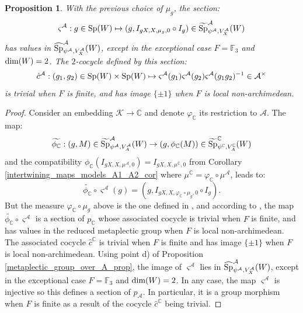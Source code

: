 \documentclass[11pt]{article}
\theoremstyle{plain}
\newtheorem{prop}[theo]{Proposition}
\theoremstyle{definition}
\theoremstyle{plain}
\theoremstyle{definition}
\theoremstyle{plain}
\begin{document}
\begin{prop} With the previous choice of $\mu_g$, the section: 
$$\varsigma^\mathcal{A} : g \in \textup{Sp}(W) \mapsto (g,I_{gX,X,\mu_g,0} \circ I_g) \in \widetilde{\textup{Sp}}_{\psi^\mathcal{A},V_X^\mathcal{A}}^\mathcal{A}(W)$$
has values in $\widehat{\textup{Sp}}_{\psi^\mathcal{A},V_X^\mathcal{A}}^\mathcal{A}(W)$, except in the exceptional case $F= \mathbb{F}_3$ and $\textup{dim}(W) = 2$. The $2$-cocycle defined by this section:
$$\hat{c}^\mathcal{A} : (g_1,g_2) \in \textup{Sp}(W) \times \textup{Sp}(W) \mapsto \varsigma^\mathcal{A}(g_1) \varsigma^\mathcal{A}(g_2) \varsigma^\mathcal{A}(g_1g_2)^{-1} \in \mathcal{A}^\times$$
is trivial when $F$ is finite, and has image $\{ \pm 1 \}$ when $F$ is local non-archimedean. \end{prop}

\begin{proof} Consider an embedding $\mathcal{K} \to \mathbb{C}$ and denote $\varphi_\mathbb{C}$ its restriction to $\mathcal{A}$. The map:
$$\widetilde{\phi_\mathbb{C}} : (g,M) \in  \widetilde{\textup{Sp}}_{\psi^\mathcal{A},V_A^\mathcal{A}}^\mathcal{A}(W) \to (g,\phi_\mathbb{C}(M)) \in \widetilde{\textup{Sp}}_{\psi^\mathbb{C},V_A^\mathbb{C}}^\mathbb{C}(W)$$
and the compatibility $\phi_\mathbb{C} (I_{gX,X,\mu^\mathcal{A},0}) = I_{gX,X,\mu^\mathbb{C},0}$ from Corollary \ref{intertwining_maps_models_A1_A2_cor} where $\mu^\mathbb{C}=\varphi_\mathbb{C} \circ \mu^\mathcal{A}$, leads to:
$$\widetilde{\phi_\mathbb{C}} \circ \varsigma^\mathcal{A} (g) = (g, I_{gX,X,\varphi_\mathbb{C} \circ \mu_g,0} \circ I_g).$$
But the measure $\varphi_\mathbb{C} \circ \mu_g$ above is the one defined in \cite[Lem. 3.23]{trias_theta1}, and according to \cite[Th. 3.27]{trias_theta1}, the map $\widetilde{\phi_\mathbb{C}} \circ \varsigma^\mathcal{A}$ is a section of $p_\mathbb{C}$ whose associated cocycle is trivial when $F$ is finite, and has values in the reduced metaplectic group when $F$ is local non-archimedean. The associated cocycle $\hat{c}^\mathbb{C}$ is trivial when $F$ is finite and has image $\{ \pm 1 \}$ when $F$ is local non-archimedean. Using point d) of Proposition \ref{metaplectic_group_over_A_prop}, the image of $\varsigma^\mathcal{A}$ lies in $\widehat{\textup{Sp}}_{\psi^\mathcal{A},V_X^\mathcal{A}}^\mathcal{A}(W)$, except in the exceptional case $F= \mathbb{F}_3$ and $\textup{dim}(W) =2$. In any case, the map $\varsigma^\mathcal{A}$ is injective so this defines a section of $p_\mathcal{A}$. In particular, it is a group morphism when $F$ is finite as a result of the cocycle $\hat{c}^\mathbb{C}$ being trivial. \end{proof}
\end{document}
